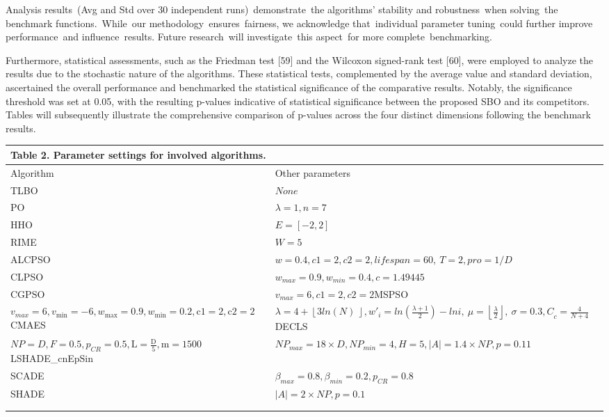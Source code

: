 \documentclass{article} %
\begin{document}
Analysis results~(Avg and Std over 30 independent runs)~demonstrate~the algorithms' stability and robustness~when solving~the benchmark functions.~While~our methodology~ensures~fairness, we acknowledge that~individual parameter tuning~could further improve performance~and influence~results. Future research~will investigate~this aspect~for more complete~benchmarking.

Furthermore, statistical assessments, such as the Friedman test [59] and the Wilcoxon signed-rank test [60], were employed to analyze the results due to the stochastic nature of the algorithms. These statistical tests, complemented by the average value and standard deviation, ascertained the overall performance and benchmarked the statistical significance of the comparative results. Notably, the significance threshold was set at 0.05, with the resulting p-values indicative of statistical significance between the proposed SBO and its competitors. Tables will subsequently illustrate the comprehensive comparison of p-values across the four distinct dimensions following the benchmark results.

\noindent 

\begin{tabular}{|p{1.1in}|p{2.8in}|} \hline 
\multicolumn{2}{|p{1in}|}{\textbf{Table }2\textbf{.} Parameter settings for involved algorithms.} \\ \hline 
Algorithm & Other parameters \\ \hline 
TLBO & $None$\textit{} \\ \hline 
PO & $λ=1,n=7$\textit{} \\ \hline 
HHO & $E=\left[-2,2\right]$\textit{} \\ \hline 
RIME & $W=5$\textit{} \\ \hline 
ALCPSO & $w=0.4,c1=2,c2=2,lifespan=60,\ T=2,pro=1/D$\textit{} \\ \hline 
CLPSO & $w_{max}=0.9,w_{min}=0.4,c=1.49445$\textit{} \\ \hline 
CGPSO & $v_{max}=6,c1=2,c2=2$MSPSO \\ \hline 
$v_{max}\mathrm{=6,}v_{\mathrm{min}}\mathrm{=-6,}w_{\mathrm{max}}\mathrm{=0.9,}w_{\mathrm{min}}\mathrm{=0.2,c1=2,c2=2}$CMAES & $λ=4+\left\lfloor 3{ln \left(N\right)\ }\right\rfloor ,w'_i={ln \left(\frac{λ+1}{2}\right)-lni,\ }μ=\left\lfloor \frac{λ}{2}\right\rfloor ,\ {σ=0.3,C}_c=\frac{4}{N+4}$DECLS \\ \hline 
$NP=D,F=0.5,p_{CR}\mathrm{=0.5,L=}\frac{\mathrm{D}}{\mathrm{5}}\mathrm{,m=1500}$LSHADE\_cnEpSin & $NP_{max}=18\times D,NP_{min}=4,H=5,\left|A\right|=1.4\times NP,p=0.11\ $\textit{} \\ \hline 
SCADE & $β_{max}=0.8,β_{min}=0.2,p_{CR}=0.8$\textit{} \\ \hline 
SHADE & $\left|A\right|=2\times NP,p=0.1$ \\ \hline 
 \\ \hline 
 \\ \hline 
\end{tabular}
\end{document}
